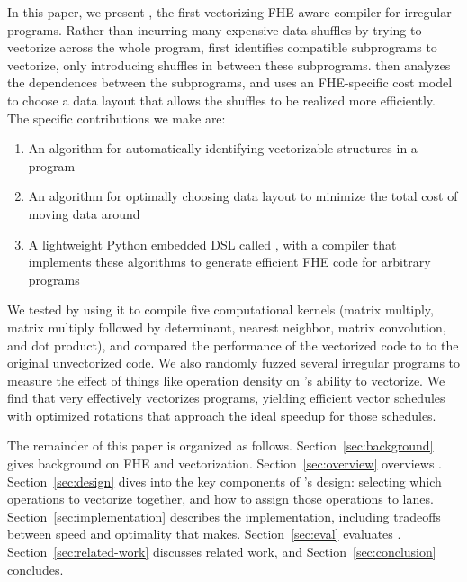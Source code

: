 In this paper, we present \system, the first vectorizing FHE-aware compiler for irregular programs.
Rather than incurring many expensive data shuffles by trying to vectorize across the whole program, \system first identifies compatible subprograms to vectorize, only introducing shuffles in between these subprograms.
\system then analyzes the dependences between the subprograms, and uses an FHE-specific cost model to choose a data layout that allows the shuffles to be realized more efficiently.
The specific contributions we make are:
\begin{enumerate}
    \item An algorithm for automatically identifying vectorizable structures in a program
    \item An algorithm for optimally choosing data layout to minimize the total cost of moving data around
    \item A lightweight Python embedded DSL called \system, with a compiler that implements these algorithms to generate efficient FHE code for arbitrary programs
\end{enumerate}

We tested \system by using it to compile five computational kernels (matrix multiply, matrix multiply followed by determinant, nearest neighbor, matrix convolution, and dot product), and compared the performance of the vectorized code to to the original unvectorized code.
We also randomly fuzzed several irregular programs to measure the effect of things like operation density on \system's ability to vectorize. We find that \system very effectively vectorizes programs, yielding efficient vector schedules with optimized rotations that approach the ideal speedup for those schedules.

The remainder of this paper is organized as follows. Section~\ref{sec:background} gives background on FHE and vectorization. Section~\ref{sec:overview} overviews \system. Section~\ref{sec:design} dives into the key components of \system's design: selecting which operations to vectorize together, and how to assign those operations to lanes. Section~\ref{sec:implementation} describes the implementation, including tradeoffs between speed and optimality that \system makes. Section~\ref{sec:eval} evaluates \system. Section~\ref{sec:related-work} discusses related work, and Section~\ref{sec:conclusion} concludes.
